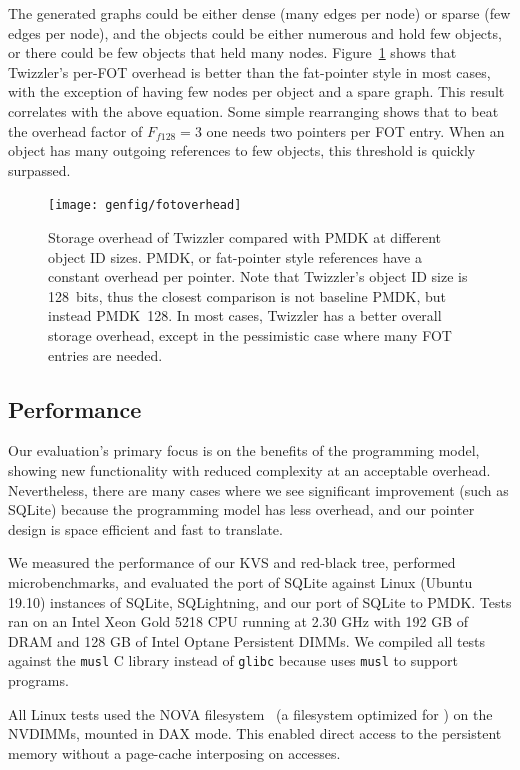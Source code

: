 The generated graphs could be either dense (many edges per node) or sparse (few edges per node), and
the objects could be either numerous and hold few objects, or there could be few objects that held
many nodes. Figure~\ref{fig:fotoverhead} shows that Twizzler's per-FOT overhead is better than the
fat-pointer style in most cases, with the exception of having few nodes per object and a spare
graph. This result correlates with the above equation. Some simple rearranging shows that to beat
the overhead factor of $F_{f128} = 3$ one needs two pointers per FOT entry. When an object has many
outgoing references to few objects, this threshold is quickly surpassed.


\begin{figure}
    \centering
    \texttt{[image: genfig/fotoverhead]}
    \caption{Storage overhead of Twizzler compared with PMDK at different object ID sizes. PMDK, or fat-pointer style references have a constant overhead per pointer. Note that Twizzler's object ID size is 128~bits, thus the closest comparison is not baseline PMDK, but instead PMDK~128. In most cases, Twizzler has a better overall storage overhead, except in the pessimistic case where many FOT entries are needed.}
    \label{fig:fotoverhead}
\end{figure}




\subsection{Performance}
\label{sec:res}

Our evaluation's primary focus is on the benefits of the programming model, showing new
functionality with reduced complexity at an acceptable overhead. Nevertheless, there are many
cases where we see significant improvement (such as SQLite)
because the programming model has less overhead, and our pointer design is space
efficient and fast to translate.

We measured the performance of our KVS and red-black tree, performed
microbenchmarks, and evaluated the \Twizzler port of
SQLite against Linux (Ubuntu 19.10) instances of SQLite, SQLightning, and our port of SQLite
to PMDK\@. Tests ran on an
Intel Xeon Gold 5218 CPU running at 2.30 GHz with 192 GB of DRAM and 128 GB of Intel Optane
Persistent DIMMs.
We compiled all tests against the \texttt{musl} C library instead of
\texttt{glibc} because \Twizzler uses \texttt{musl} to support \unix programs.

All Linux tests used the NOVA filesystem~\cite{Xu:nova} (a filesystem
optimized for \NVM) on the NVDIMMs, mounted in DAX mode. This enabled direct access to the
persistent memory without a page-cache interposing on accesses.

